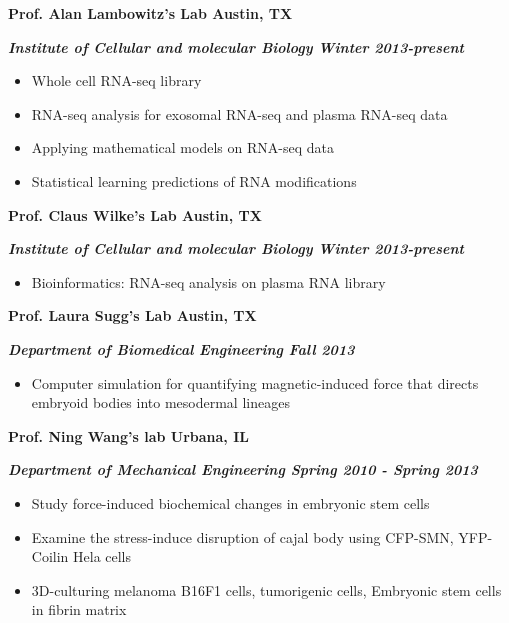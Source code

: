 \documentclass[dvips,11pt]{article}
\begin{document}
\noindent \centerline{\bf Prof. Alan Lambowitz's Lab \hfill	Austin, TX}
\noindent \centerline{\textit{\textbf{Institute of Cellular and molecular Biology \hfill Winter 2013-present}}}
\vspace{-2mm}
\begin{itemize} \itemsep1pt \parskip0pt 
	\setlength{\itemsep}{0pt}
	\item Whole cell RNA-seq library
	\item RNA-seq analysis for exosomal RNA-seq and plasma RNA-seq data
	\item Applying mathematical models on RNA-seq data
	\item Statistical learning predictions of RNA modifications
\end{itemize}

\noindent \centerline{\bf Prof. Claus Wilke's Lab \hfill	Austin, TX}
\noindent \centerline{\textit {\textbf{Institute of Cellular and molecular Biology \hfill Winter 2013-present}}}
\vspace{-2mm}
\begin{itemize} \itemsep1pt \parskip0pt 
	\setlength{\itemsep}{0pt}
	\item Bioinformatics: RNA-seq analysis on plasma RNA library
\end{itemize}

\noindent \centerline{\bf Prof. Laura Sugg's Lab \hfill	Austin, TX}
\noindent \centerline{\textbf{\textit{Department of Biomedical Engineering \hfill Fall 2013}}}
\vspace{-2mm}
\begin{itemize} \itemsep1pt \parskip0pt 
	\setlength{\itemsep}{0pt}
	\item Computer simulation for quantifying magnetic-induced force that directs embryoid bodies into mesodermal lineages
\end{itemize}

\noindent \centerline{\bf Prof. Ning Wang's lab \hfill Urbana, IL}
\noindent \centerline{\bf{\textit{Department of Mechanical Engineering \hfill Spring 2010 - Spring 2013} }}
\vspace{-2mm}
\begin{itemize} \itemsep1pt \parskip0pt 
	\setlength{\itemsep}{0pt}
	\item Study force-induced biochemical changes in embryonic stem cells
	\item Examine the stress-induce disruption of cajal body using CFP-SMN, YFP-Coilin Hela cells
	\item 3D-culturing melanoma B16F1 cells, tumorigenic cells, Embryonic stem cells in fibrin matrix
\end{itemize}
\end{document}
